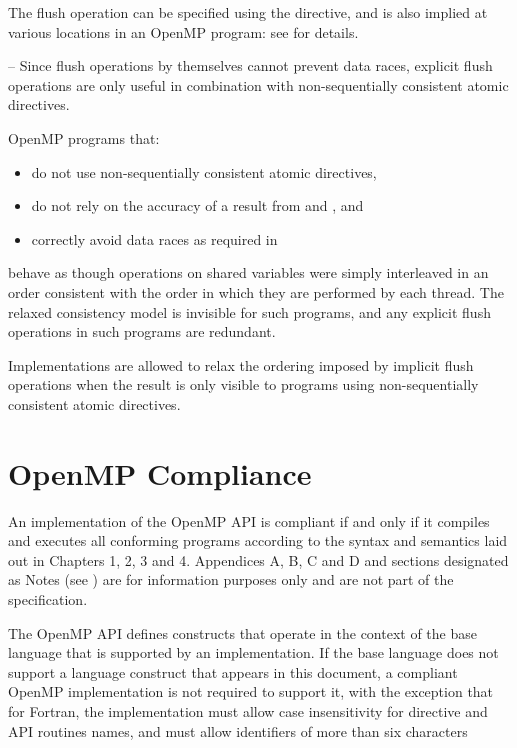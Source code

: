 The flush operation can be specified using the  directive, and is also implied at 
various locations in an OpenMP program: see  for details.

\notestart
\noteheader – Since flush operations by themselves cannot prevent data races, explicit flush 
operations are only useful in combination with non-sequentially consistent atomic 
directives.
\noteend

OpenMP programs that:

\begin{itemize}[rightmargin=11ex]
\item do not use non-sequentially consistent atomic directives,

\item do not rely on the accuracy of a  result from 
 and , and

\item correctly avoid data races as required in  
\end{itemize}

behave as though operations on shared variables were simply interleaved in an order 
consistent with the order in which they are performed by each thread. The relaxed 
consistency model is invisible for such programs, and any explicit flush operations in 
such programs are redundant.

Implementations are allowed to relax the ordering imposed by implicit flush operations 
when the result is only visible to programs using non-sequentially consistent atomic 
directives.








\section{OpenMP Compliance}
\label{sec:OpenMP Compliance}
An implementation of the OpenMP API is compliant if and only if it compiles and 
executes all conforming programs according to the syntax and semantics laid out in 
Chapters 1, 2, 3 and 4. Appendices A, B, C and D and sections designated as Notes 
(see ) 
are for information purposes only and are not part of the 
specification.

The OpenMP API defines constructs that operate in the context of the base language that 
is supported by an implementation. If the base language does not support a language 
construct that appears in this document, a compliant OpenMP implementation is not 
required to support it, with the exception that for Fortran, the implementation must 
allow case insensitivity for directive and API routines names, and must allow identifiers 
of more than six characters

